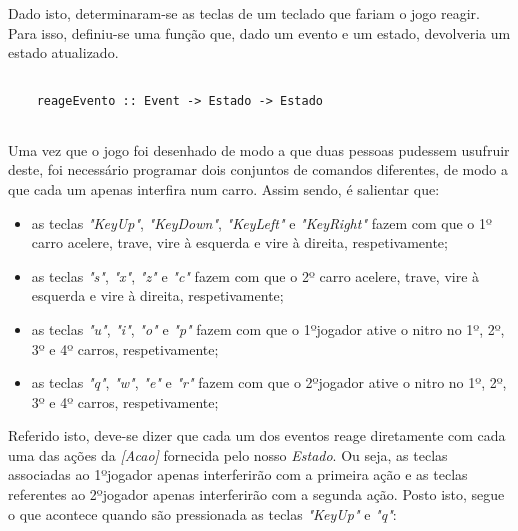\documentclass[a4paper]{report} %
\begin{document}
  \newpage
  
  \par \noindent Dado isto, determinaram-se as teclas de um teclado que fariam o jogo reagir. Para isso, definiu-se uma função que, dado um evento e um estado, devolveria um estado atualizado. 
  
  \begin{verbatim}
      
    reageEvento :: Event -> Estado -> Estado  
      
  \end{verbatim}
  
  \par \noindent Uma vez que o jogo foi desenhado de modo a que duas pessoas pudessem usufruir deste, foi necessário programar dois conjuntos de comandos diferentes, de modo a que cada um apenas interfira num carro. Assim sendo, é salientar que:
  
  \begin{itemize}
      
      \item as teclas \textit{"KeyUp"}, \textit{"KeyDown"}, \textit{"KeyLeft"} e \textit{"KeyRight"} fazem com que o 1º carro acelere, trave, vire à esquerda e vire à direita, respetivamente;
      
      \item as teclas \textit{"s"}, \textit{"x"}, \textit{"z"} e \textit{"c"} fazem com que o 2º carro acelere, trave, vire à esquerda e vire à direita, respetivamente;
      
      \item as teclas \textit{"u"}, \textit{"i"}, \textit{"o"} e \textit{"p"} fazem com que o 1ºjogador ative o nitro no 1º, 2º, 3º e 4º carros, respetivamente;
      
      \item as teclas \textit{"q"}, \textit{"w"}, \textit{"e"} e \textit{"r"} fazem com que o 2ºjogador ative o nitro no 1º, 2º, 3º e 4º carros, respetivamente;
      
  \end{itemize}
  
  \par \noindent Referido isto, deve-se dizer que cada um dos eventos reage diretamente com cada uma das ações da \textit{[Acao]} fornecida pelo nosso \textit{Estado}. Ou seja, as teclas associadas ao 1ºjogador apenas interferirão com a primeira ação e as teclas referentes ao 2ºjogador apenas interferirão com a segunda ação. Posto isto, segue o que acontece quando são pressionada as teclas \textit{"KeyUp"} e \textit{"q"}:
  
\end{document}
